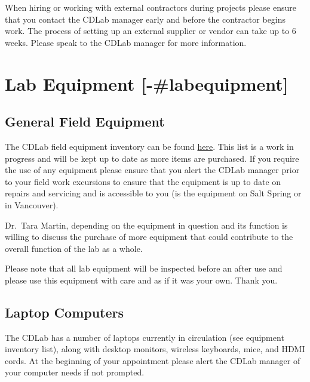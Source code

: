 \documentclass[
]{book}
\begin{document}
When hiring or working with external contractors during projects please ensure that you contact the CDLab manager early and before the contractor begins work. The process of setting up an external supplier or vendor can take up to 6 weeks. Please speak to the CDLab manager for more information.

\hypertarget{lab-equipment--labequipment}{%
\chapter{Lab Equipment {[}-\#labequipment{]}}\label{lab-equipment--labequipment}}

\hypertarget{fieldequipment}{%
\section*{General Field Equipment}\label{fieldequipment}}

The CDLab field equipment inventory can be found \href{https://www.dropbox.com/home/Conservation\%20Decisions\%20Lab/01_Equipment?preview=Equipment+inventory.xlsx}{here}. This list is a work in progress and will be kept up to date as more items are purchased. If you require the use of any equipment please ensure that you alert the CDLab manager prior to your field work excursions to ensure that the equipment is up to date on repairs and servicing and is accessible to you (is the equipment on Salt Spring or in Vancouver).

Dr.~Tara Martin, depending on the equipment in question and its function is willing to discuss the purchase of more equipment that could contribute to the overall function of the lab as a whole.

Please note that all lab equipment will be inspected before an after use and please use this equipment with care and as if it was your own. Thank you.

\hypertarget{laptops}{%
\section*{Laptop Computers}\label{laptops}}

The CDLab has a number of laptops currently in circulation (see equipment inventory list), along with desktop monitors, wireless keyboards, mice, and HDMI cords. At the beginning of your appointment please alert the CDLab manager of your computer needs if not prompted.
\end{document}
